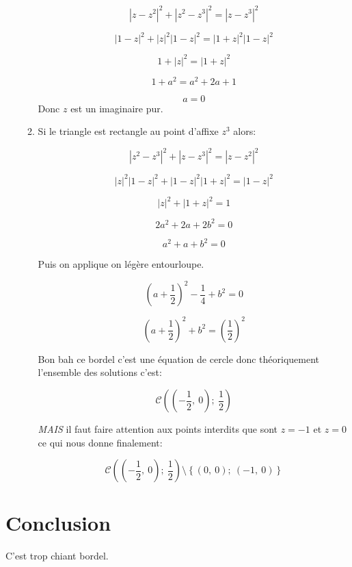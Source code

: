 \documentclass[article,11pt]{article}
\newcommand{\eqencld}[1]{
\begin{equation*}#1\end{equation*}
}
\newcommand{\bgp}[1]{
\left(#1\right)
}
\newcommand{\bgbr}[1]{
\left\{#1\right\}
}
\newcommand{\fabs}[1]{
\left|#1\right|
}
\begin{document}
\begin{enumerate}
\begin{enumerate}[label=-]
\eqencld{\fabs{z-z^{2}}^{2}+\fabs{z^{2}-z^{3}}^{2}=\fabs{z-z^{3}}^{2}}
\eqencld{\fabs{1-z}^{2}+\fabs{z}^{2}\fabs{1-z}^{2}=\fabs{1+z}^{2}\fabs{1-z}^{2}}
\eqencld{1+\fabs{z}^{2}=\fabs{1+z}^{2}}
\eqencld{1+a^{2}=a^{2}+2a+1}
\eqencld{a=0} Donc $z$ est un imaginaire pur.
\item Si le triangle est rectangle au point d'affixe $z^{3}$ alors:
\eqencld{\fabs{z^{2}-z^{3}}^{2}+\fabs{z-z^{3}}^{2}=\fabs{z-z^{2}}^{2}}
\eqencld{\fabs{z}^{2}\fabs{1-z}^{2}+\fabs{1-z}^{2}\fabs{1+z}^{2}=\fabs{1-z}^{2}}
\eqencld{\fabs{z}^{2}+\fabs{1+z}^{2}=1}
\eqencld{2a^{2}+2a+2b^{2}=0}
\eqencld{a^{2}+a+b^{2}=0}
Puis on applique on légère entourloupe.
\eqencld{\bgp{a+\frac{1}{2}}^{2}-\frac{1}{4}+b^{2}=0}
\eqencld{\bgp{a+\frac{1}{2}}^{2}+b^{2}=\bgp{\frac{1}{2}}^{2}}
Bon bah ce bordel c'est une équation de cercle donc théoriquement l'ensemble des solutions c'est:
\eqencld{\mathscr{C}\bgp{\bgp{-\frac{1}{2},\ 0};\ \frac{1}{2}}}
\textsl{MAIS} il faut faire attention aux points interdits que sont $z=-1$ et $z=0$ ce qui nous donne finalement:
\eqencld{\mathscr{C}\bgp{\bgp{-\frac{1}{2},\ 0};\ \frac{1}{2}}\setminus\bgbr{\bgp{0,\ 0};\ \bgp{-1,\ 0}}}
\end{enumerate}
\end{enumerate}

\section{Conclusion}

C'est trop chiant bordel.
\end{document}
